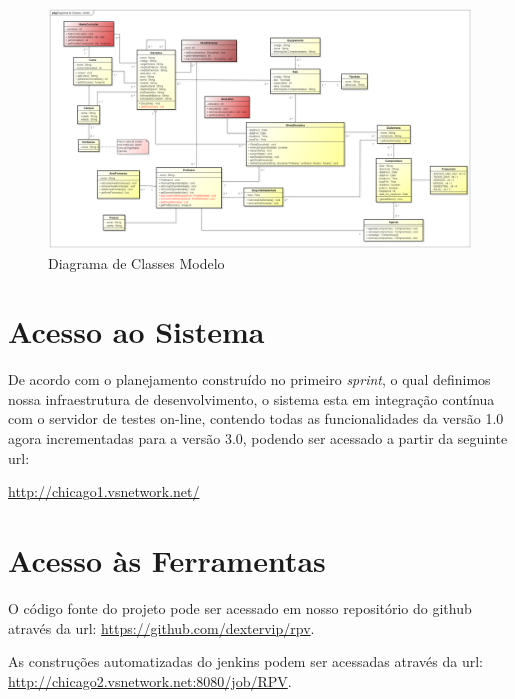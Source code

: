 \documentclass{abnt}
\begin{document}
		 \begin{landscape}
		 			\begin{figure}[htp]
		 				\begin{center}
		 					 \includegraphics[width=600px]{DiagramaClassesModelo}
		 					 \caption{Diagrama de Classes Modelo}
		 					 \label{fig:DiagramaClassesModelo}
		 				\end{center}
		 			\end{figure}
		 		\end{landscape}
		 		 
\clearpage
	\section{Acesso ao Sistema}
			De acordo com o planejamento construído no primeiro \emph{sprint}, o qual definimos nossa infraestrutura de desenvolvimento, 
			o sistema esta em integração contínua com o servidor de testes on-line, contendo todas as funcionalidades da versão 1.0 agora incrementadas para a versão 3.0, 
			podendo ser acessado a partir da seguinte url:
		
			\url{http://chicago1.vsnetwork.net/}
			
			
			

	\section{Acesso às Ferramentas}
		
		O código fonte do projeto pode ser acessado em nosso repositório do github\cite{GITHUB} através da url: \url{https://github.com/dextervip/rpv}. 
		
		As construções automatizadas do jenkins podem ser acessadas através da url: \url{http://chicago2.vsnetwork.net:8080/job/RPV}.

	\clearpage

	\nocite{*}
	
			
\end{document}

